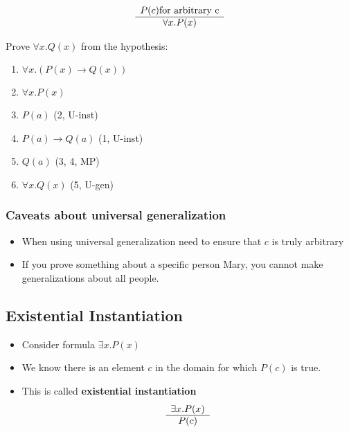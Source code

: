 \documentclass[8pt]{scrreprt}
\begin{document}
\begin{landscape}
\begin{multicols*}{3}
\begin{itemize}
	      \[
		      \begin{array}[]{c}
			      P(c) \text{for arbitrary c} \\
			      \hline
			      \forall x. P(x)
		      \end{array}
	      \]
\end{itemize}

\begin{example}
	Prove $\forall x. Q(x)$ from the hypothesis:

	\begin{enumerate}
		\item $\forall x. (P(x)\rightarrow Q(x))$
		\item $\forall x. P(x)$
		\item $P(a)$ (2, U-inst)
		\item $P(a)\rightarrow Q(a)$ (1, U-inst)
		\item $Q(a)$ (3, 4, MP)
		\item $\forall x. Q(x)$ (5, U-gen)
	\end{enumerate}
\end{example}

\subsubsection{Caveats about universal generalization}
\begin{itemize}
	\item When using universal generalization need to ensure that $c$ is truly arbitrary
	\item If you prove something about a specific person Mary, you cannot make generalizations about all people.
\end{itemize}

\subsection{Existential Instantiation}
\begin{itemize}
	\item Consider formula $\exists x. P(x)$
	\item We know there is an element $c$ in the domain for which $P(c)$ is true.
	\item This is called \textbf{existential instantiation}
	      \[
		      \begin{array}[]{c}
			      \exists x. P(x) \\
			      \hline
			      P(c)
		      \end{array}
	      \]


\end{itemize}
\end{multicols*}
\end{landscape}
\end{document}
